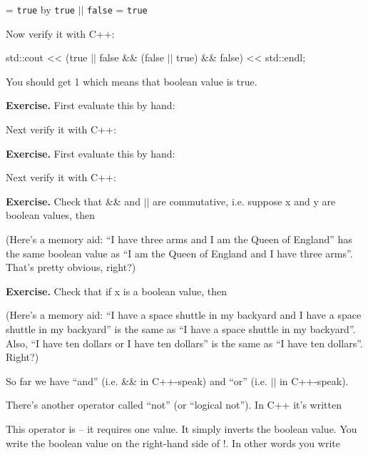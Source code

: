 {= \texttt{true}                             by \texttt{true} $||$ \texttt{false} = \texttt{true}

Now verify it with C++:
\begin{console}
std::cout << (true $||$ false && (false $||$ true) && false)
          << std::endl;
\end{console}

You should get 1 which means that boolean value is true.

\textbf{Exercise.} First evaluate this by hand:

  
Next verify it with C++:

\textbf{Exercise.} First evaluate this by hand:


Next verify it with C++:

\textbf{Exercise.} Check that \&\& and $||$ are commutative, i.e. suppose x and y are boolean values, then



(Here's a memory aid: “I have three arms and I am the Queen of England” has the same boolean value as “I am the Queen of England and I have three arms”. That's pretty obvious, right?)

\textbf{Exercise.} Check that if x is a boolean value, then



(Here's a memory aid: “I have a space shuttle in my backyard and I have
a space shuttle in my backyard” is the same as “I have a space shuttle in
my backyard”. Also, “I have ten dollars or I have ten dollars” is the same
as “I have ten dollars”. Right?)


So far we have “and” (i.e. \&\& in C++-speak) and “or” (i.e. $||$ in C++-speak).

There's another operator called “not” (or “logical not”). In C++ it's written

\tab[15em]\EMPHASIZE{\textbf{!}}

This operator is  – it requires one value. It simply inverts the boolean value. You write the boolean value on the right-hand side of !. In
other words you write

}
